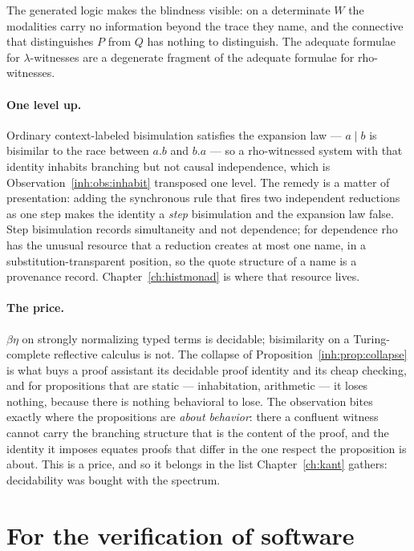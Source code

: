 The generated logic makes the blindness visible: on a determinate $W$
the modalities carry no information beyond the trace they name, and the
connective that distinguishes $P$ from $Q$ has nothing to distinguish.
The adequate formulae for $\lambda$-witnesses are a degenerate fragment
of the adequate formulae for rho-witnesses.

\paragraph{One level up.}
Ordinary context-labeled bisimulation satisfies the expansion law ---
$a \mid b$ is bisimilar to the race between $a.b$ and $b.a$ --- so a
rho-witnessed system with that identity inhabits branching but not
causal independence, which is Observation~\ref{inh:obs:inhabit}
transposed one level.
The remedy is a matter of presentation: adding the synchronous rule that
fires two independent reductions as one step makes the identity a
\emph{step} bisimulation and the expansion law false.
Step bisimulation records simultaneity and not dependence; for
dependence rho has the unusual resource that a reduction creates at
most one name, in a substitution-transparent position, so the quote
structure of a name is a provenance record.
Chapter~\ref{ch:histmonad} is where that resource lives.

\paragraph{The price.}
$\beta\eta$ on strongly normalizing typed terms is decidable;
bisimilarity on a Turing-complete reflective calculus is not.
The collapse of Proposition~\ref{inh:prop:collapse} is what buys a proof
assistant its decidable proof identity and its cheap checking, and for
propositions that are static --- inhabitation, arithmetic --- it loses
nothing, because there is nothing behavioral to lose.
The observation bites exactly where the propositions are \emph{about
behavior}: there a confluent witness cannot carry the branching
structure that is the content of the proof, and the identity it imposes
equates proofs that differ in the one respect the proposition is about.
This is a price, and so it belongs in the list Chapter~\ref{ch:kant}
gathers: decidability was bought with the spectrum.

\section{For the verification of software}
\label{inh:sec:verification}

